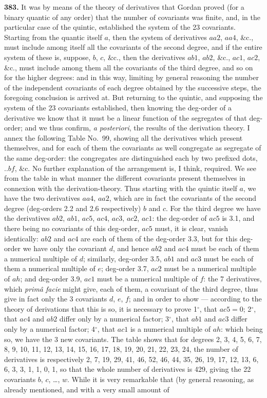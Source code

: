 \documentclass[11pt,a4paper]{book}
\begin{document}
\noindent\textbf{383.} It was by means of the theory of derivatives that Gordan proved (for a binary quantic of any order) that the number of covariants was finite, and, in the particular case of the quintic, established the system of the 23 covariants. Starting from the quantic itself $a$, then the system of derivatives $aa2$, $aa4$, \&c., must include among itself all the covariants of the second degree, and if the entire system of these is, suppose, $b$, $c$, \&c., then the derivatives $ab1$, $ab2$, \&c., $ac1$, $ac2$, \&c., must include among them all the covariants of the third degree, and so on for the higher degrees: and in this way, limiting by general reasoning the number of the independent covariants of each degree obtained by the successive steps, the foregoing conclusion is arrived at. But returning to the quintic, and supposing the system of the 23 covariants established, then knowing the deg-order of a derivative we know that it must be a linear function of the segregates of that deg-order; and we thus confirm, \textit{a posteriori}, the results of the derivation theory. I annex the following Table No.~99, showing all the derivatives which present themselves, and for each of them the covariants as well congregate as segregate of the same deg-order: the congregates are distinguished each by two prefixed dots, $..bf$, \&c. No further explanation of the arrangement is, I think, required. We see from the table in what manner the different covariants present themselves in connexion with the derivation-theory. Thus starting with the quintic itself $a$, we have the two derivatives $aa4$, $aa2$, which are in fact the covariants of the second degree (deg-orders 2.2 and 2.6 respectively) $b$ and $c$. For the third degree we have the derivatives $ab2$, $ab1$, $ac5$, $ac4$, $ac3$, $ac2$, $ac1$: the deg-order of $ac5$ is 3.1, and there being no covariants of this deg-order, $ac5$ must, it is clear, vanish identically: $ab2$ and $ac4$ are each of them of the deg-order 3.3, but for this deg-order we have only the covariant $d$, and hence $ab2$ and $ac4$ must be each of them a numerical multiple of $d$; similarly, deg-order 3.5, $ab1$ and $ac3$ must be each of them a numerical multiple of $e$; deg-order 3.7, $ac2$ must be a numerical multiple of $ah$; and deg-order 3.9, $ac1$ must be a numerical multiple of $f$: the 7 derivatives, which \textit{prim\^a facie} might give, each of them, a covariant of the third degree, thus give in fact only the 3 covariants $d$, $e$, $f$; and in order to show --- according to the theory of derivations that this is so, it is necessary to prove 1$^\circ$, that $ac5 = 0$; 2$^\circ$, that $ac4$ and $ab2$ differ only by a numerical factor; 3$^\circ$, that $ab1$ and $ac3$ differ only by a numerical factor; 4$^\circ$, that $ac1$ is a numerical multiple of $ah$: which being so, we have the 3 new covariants. The table shows that for degrees 2, 3, 4, 5, 6, 7, 8, 9, 10, 11, 12, 13, 14, 15, 16, 17, 18, 19, 20, 21, 22, 23, 24, the number of derivatives is respectively 2, 7, 19, 29, 41, 46, 52, 46, 44, 35, 26, 19, 17, 12, 13, 6, 6, 3, 3, 1, 1, 0, 1, so that the whole number of derivatives is 429, giving the 22 covariants $b$, $c$, \ldots, $w$. While it is very remarkable that (by general reasoning, as already mentioned, and with a very small amount of 
\end{document}
